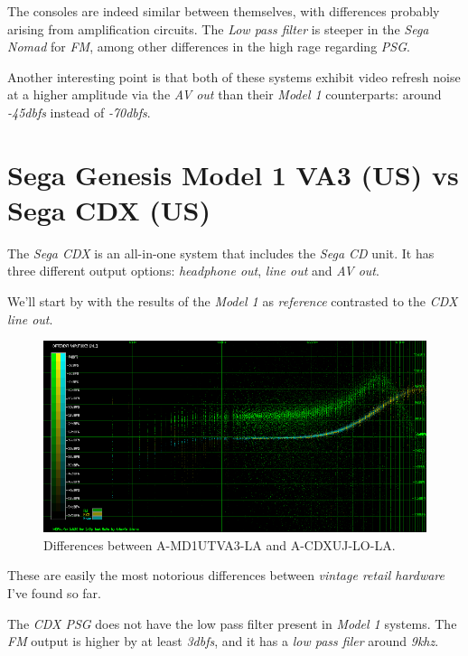\documentclass[10pt,a4paper]{report}
\newcommand{\khz}[1]{\textit{\mbox{#1\acrshort{khz}}}}
\newcommand{\db}[1]{\textit{\mbox{#1\acrshort{dbfs}}}}
\begin{document}
The consoles are indeed similar between themselves, with differences probably arising from amplification circuits. The \textit{Low pass filter} is steeper in the \textit{Sega Nomad} for \textit{FM}, among other differences in the high rage regarding \textit{PSG}.

Another interesting point is that both of these systems exhibit video refresh noise at a higher amplitude via the \textit{AV out} than their \textit{Model 1} counterparts: around \db{-45} instead of \db{-70}.

\section{Sega Genesis Model 1 VA3 (US) vs\\ Sega CDX (US)}

The \textit{Sega CDX} is an all-in-one system that includes the \textit{Sega CD} unit. It has three different output options: \textit{headphone out}, \textit{line out} and \textit{AV out}.

We'll start by with the results of the \textit{Model 1} as \textit{reference} contrasted to the \textit{CDX line out}.

\begin{figure}[H]
	\centering
	\includegraphics[width=1.0\linewidth]{images/results/8-A-MD1UTVA3-LA_vs_A-CDXUJ-LO-LA.png}
	\caption[A-MD1UTVA3-LA vs A-CDXUJ-LO-LA]{Differences between A-MD1UTVA3-LA and A-CDXUJ-LO-LA.}
	\label{fig:A-MD1UTVA3-LA_vs_A-CDXUJ-LO-LA}
\end{figure}

These are easily the most notorious differences between \textit{vintage retail hardware} I've found so far. 

The \textit{CDX PSG} does not have the low pass filter present in \textit{Model 1} systems. The \textit{FM} output is higher by at least \db{3}, and it has a \textit{low pass filer} around \khz{9}.
\end{document}
